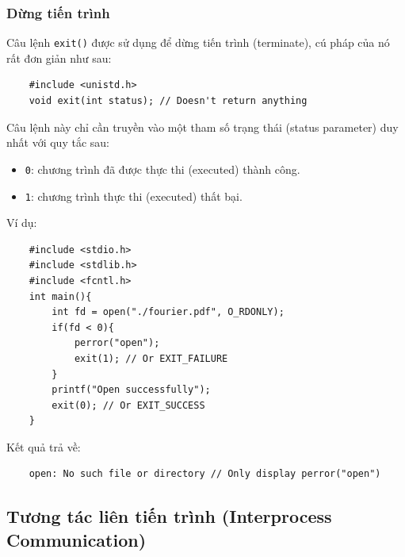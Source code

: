 \documentclass{article}
\begin{document}
\subsubsection{Dừng tiến trình}
Câu lệnh \verb|exit()| được sử dụng để dừng tiến trình (terminate), cú pháp của nó rất đơn giản như sau:
\begin{verbatim}
    #include <unistd.h>
    void exit(int status); // Doesn't return anything
\end{verbatim}
Câu lệnh này chỉ cần  truyền vào một tham số trạng thái (status parameter) duy nhất với quy tắc sau:
\begin{itemize}
    \item \verb|0|: chương trình đã được thực thi (executed) thành công.
    \item \verb|1|: chương trình thực thi (executed) thất bại.
\end{itemize}
Ví dụ:
\begin{verbatim}
    #include <stdio.h>
    #include <stdlib.h>
    #include <fcntl.h>
    int main(){
        int fd = open("./fourier.pdf", O_RDONLY);
        if(fd < 0){
            perror("open");
            exit(1); // Or EXIT_FAILURE
        }
        printf("Open successfully");
        exit(0); // Or EXIT_SUCCESS
    }
\end{verbatim}
Kết quả trả về:
\begin{verbatim}
    open: No such file or directory // Only display perror("open")
\end{verbatim}
\subsection{Tương tác liên tiến trình (Interprocess Communication)}
\end{document}
